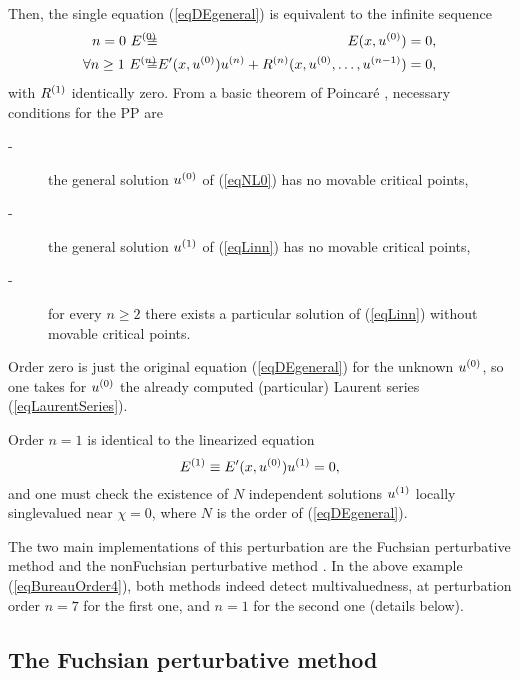 \documentclass[10pt]{article}
\begin{document}
Then, the single equation (\ref{eqDEgeneral}) is equivalent to the infinite 
sequence
\begin{eqnarray}
\label{eqNL0} 
         n  =  0\ 
\bfE^{(0)}
{\hskip -3.5 truemm} & \equiv & {\hskip -3.5 truemm}
\bfE (x,\bfu^{(0)}) = 0,
\\
 \forall n \ge 1\ 
\bfE^{(n)}
{\hskip -3.5 truemm} & \equiv & {\hskip -3.5 truemm}
\bfE'(x,\bfu^{(0)}) \bfu^{(n)} 
             + \bfR^{(n)}(x,\bfu^{(0)},\dots,\bfu^{(n-1)}) = 0,
\label{eqLinn}
\end{eqnarray}
with ${ R}^{(1)}$ identically zero.
{}From a basic theorem of Poincar\'e 
\cite[Theorem II, \S 5.3]{Cargese1996Conte},
necessary conditions for the PP are
\begin{description} 
\item[-]
the general solution ${ u}^{(0)}$ of (\ref{eqNL0}) has no
movable critical points,
\item[-]
the general solution ${ u}^{(1)}$ of (\ref{eqLinn}) has no
movable critical points,
\item[-]
for every $n\ge 2$ there exists a particular solution of (\ref{eqLinn}) 
without movable critical points.
\end{description} 

Order zero is just the original equation (\ref{eqDEgeneral}) 
for the unknown ${ u}^{(0)}$,
so one takes for ${ u}^{(0)}$
the already computed (particular) Laurent series (\ref{eqLaurentSeries}).

Order $n=1$ is identical to the linearized equation 
\begin{equation}
 { E}^{(1)} \equiv { E}'(x,{ u}^{(0)}) { u}^{(1)} = 0,
\label{eqLin0}
\end{equation}
and one must check the existence of $N$ independent solutions ${ u}^{(1)}$
locally singlevalued near $\chi=0$,
where $N$ is the order of (\ref{eqDEgeneral}).

The two main implementations of this perturbation are the 
Fuchsian perturbative method \cite{CFP1993}
and the
nonFuchsian perturbative method \cite{MC1995}.
In the above example (\ref{eqBureauOrder4}),                    
both methods indeed detect multivaluedness,
at perturbation order $n=7$ for the first one,
and $n=1$ for the second one (details below).

\subsection{The Fuchsian perturbative method}
\label{sectionMethodPerturbativeFuchsian}
\end{document}
